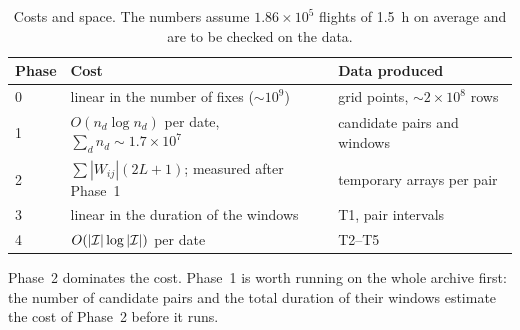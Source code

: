 \begin{table}
\centering
\small
\begin{tabular}{@{}l l l@{}}
\toprule
Phase & Cost & Data produced \\
\midrule
0 & linear in the number of fixes ($\sim10^9$) & grid points, $\sim2\times10^8$ rows \\
1 & $O(n_d\log n_d)$ per date, $\sum_d n_d\sim1.7\times10^7$ & candidate pairs and windows \\
2 & $\sum|W_{ij}|(2L+1)$; measured after Phase~1 & temporary arrays per pair \\
3 & linear in the duration of the windows & T1, pair intervals \\
4 & $O(|\mathcal{I}|\log|\mathcal{I}|)$ per date & T2--T5 \\
\bottomrule
\end{tabular}
\caption{Costs and space. The numbers assume $1.86\times10^5$ flights of 1.5~h on average and are
to be checked on the data.}
\label{tab:costs}
\end{table}

Phase~2 dominates the cost. Phase~1 is worth running on the whole archive first: the number of
candidate pairs and the total duration of their windows estimate the cost of Phase~2 before it
runs.
